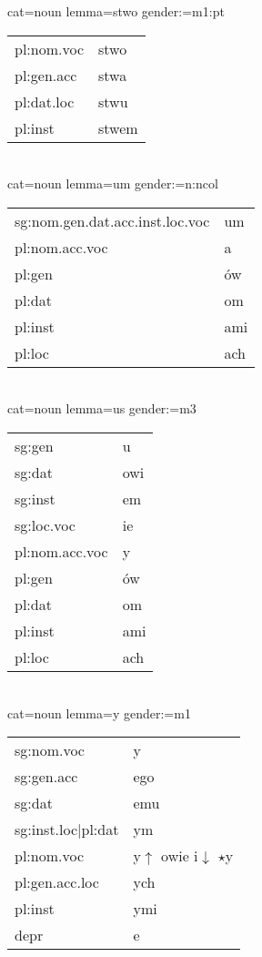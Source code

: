 \documentclass{article}
\begin{document}
\begin{multicols}{2}
cat=noun lemma=stwo gender:=m1:pt\\
\begin{tabular}{l|l}
pl:nom.voc & stwo\\
pl:gen.acc & stwa\\
pl:dat.loc & stwu\\
pl:inst & stwem\\
\end{tabular}\\

cat=noun lemma=um gender:=n:ncol\\
\begin{tabular}{l|l}
sg:nom.gen.dat.acc.inst.loc.voc & um\\
pl:nom.acc.voc & a\\
pl:gen & ów\\
pl:dat & om\\
pl:inst & ami\\
pl:loc & ach\\
\end{tabular}\\

cat=noun lemma=us gender:=m3\\
\begin{tabular}{l|l}
sg:gen & u\\
sg:dat & owi\\
sg:inst & em\\
sg:loc.voc & ie\\
pl:nom.acc.voc & y\\
pl:gen & ów\\
pl:dat & om\\
pl:inst & ami\\
pl:loc & ach\\
\end{tabular}\\

cat=noun lemma=y gender:=m1\\
\begin{tabular}{l|l}
sg:nom.voc & y\\
sg:gen.acc & ego\\
sg:dat & emu\\
sg:inst.loc|pl:dat & ym\\
pl:nom.voc & y$\uparrow$ owie i$\downarrow$ $\star$y\\
pl:gen.acc.loc & ych\\
pl:inst & ymi\\
depr & e\\
\end{tabular}\\


\end{multicols}
\end{document}

